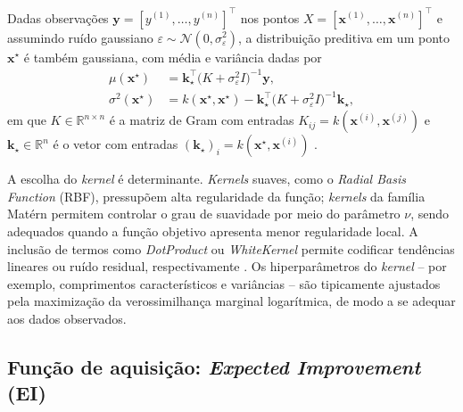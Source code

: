 Dadas observações $\bm{y} = [y^{(1)}, \dots, y^{(n)}]^\top$ nos pontos $X = [\bm{x}^{(1)}, \dots, \bm{x}^{(n)}]^\top$ e assumindo ruído gaussiano $\varepsilon \sim \mathcal{N}(0, \sigma_\varepsilon^2)$, a distribuição preditiva em um ponto $\bm{x}^\star$ é também gaussiana, com média e variância dadas por
\begin{align}
    \mu(\bm{x}^\star) &= \bm{k}_\star^\top \bigl(K + \sigma_\varepsilon^2 I\bigr)^{-1} \bm{y},
    \label{eq:gpr_mean}\\
    \sigma^2(\bm{x}^\star) &= k(\bm{x}^\star, \bm{x}^\star) - \bm{k}_\star^\top \bigl(K + \sigma_\varepsilon^2 I\bigr)^{-1} \bm{k}_\star,
    \label{eq:gpr_var}
\end{align}
em que $K \in \mathbb{R}^{n \times n}$ é a matriz de Gram com entradas $K_{ij} = k(\bm{x}^{(i)}, \bm{x}^{(j)})$ e $\bm{k}_\star \in \mathbb{R}^{n}$ é o vetor com entradas $(\bm{k}_\star)_i = k(\bm{x}^\star, \bm{x}^{(i)})$ .

A escolha do \textit{kernel} é determinante. \textit{Kernels} suaves, como o \textit{Radial Basis Function} (RBF), pressupõem alta regularidade da função; \textit{kernels} da família Matérn permitem controlar o grau de suavidade por meio do parâmetro $\nu$, sendo adequados quando a função objetivo apresenta menor regularidade local. A inclusão de termos como \textit{DotProduct} ou \textit{WhiteKernel} permite codificar tendências lineares ou ruído residual, respectivamente . Os hiperparâmetros do \textit{kernel} -- por exemplo, comprimentos característicos e variâncias -- são tipicamente ajustados pela maximização da verossimilhança marginal logarítmica, de modo a se adequar aos dados observados.

\subsection{Função de aquisição: \textit{Expected Improvement} (EI)}
\label{sec:fund_ei}


